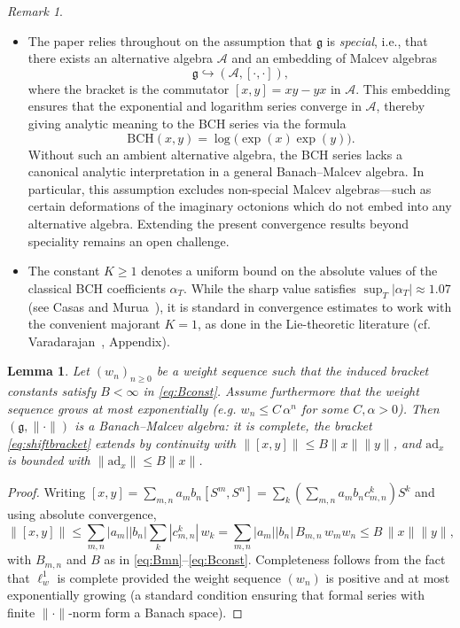 \documentclass[11pt]{amsart}
\numberwithin{equation}{section}
\newtheorem{lemma}[theorem]{Lemma}
\theoremstyle{remark}
\newtheorem{remark}[theorem]{Remark}
\begin{document}
\begin{remark}\begin{itemize}
\item The paper relies throughout on the assumption that $\mathfrak{g}$ is \emph{special}, i.e., that there exists an alternative algebra $\mathcal A$ and an embedding of Malcev algebras
\[
\mathfrak{g} \hookrightarrow (\mathcal A, [\cdot,\cdot]),
\]
where the bracket is the commutator $[x,y] = xy - yx$ in $\mathcal A$. This embedding ensures that the exponential and logarithm series converge in $\mathcal A$, thereby giving analytic meaning to the BCH series via the formula
\[
\mathrm{BCH}(x,y) = \log\bigl(\exp(x)\exp(y)\bigr).
\]
Without such an ambient alternative algebra, the BCH series lacks a canonical analytic interpretation in a general Banach--Malcev algebra. In particular, this assumption excludes non-special Malcev algebras—such as certain deformations of the imaginary octonions which do not embed into any alternative algebra. Extending the present convergence results beyond speciality remains an open challenge.\\

\item The constant \( K \geq 1 \) denotes a uniform bound on the absolute values of the classical BCH coefficients \( \alpha_T \). While the sharp value satisfies \( \sup_T |\alpha_T| \approx 1.07 \) (see Casas and Murua~\cite{CasasMurua2009}), it is standard in convergence estimates to work with the convenient majorant \( K = 1 \), as done in the Lie-theoretic literature (cf. Varadarajan~\cite{Varadarajan1984}, Appendix).\end{itemize}
\end{remark}

\begin{lemma}\label{lem:completeness}
Let $(w_n)_{n\ge0}$ be a weight sequence such that the induced bracket constants satisfy $B<\infty$ in \eqref{eq:Bconst}. Assume furthermore that the weight sequence grows at most exponentially (e.g. $w_n \le C\,\alpha^n$ for some $C,\alpha>0$). Then $(\mathfrak g,\|\cdot\|)$ is a Banach--Malcev algebra: it is complete, the bracket \eqref{eq:shiftbracket} extends by continuity with $\|[x,y]\| \le B\|x\|\|y\|$, and $\mathrm{ad}_x$ is bounded with $\|\mathrm{ad}_x\|\le B\|x\|$.
\end{lemma}

\begin{proof}
Writing $[x,y]=\sum_{m,n} a_m b_n [S^m,S^n]=\sum_k(\sum_{m,n} a_m b_n c_{m,n}^{k})S^k$ and using absolute convergence,
\[
\|[x,y]\|
\le \sum_{m,n} |a_m||b_n| \sum_k |c_{m,n}^k|\, w_k
= \sum_{m,n} |a_m||b_n|\, B_{m,n}\, w_m w_n
\le B\,\|x\|\|y\|,
\]
with $B_{m,n}$ and $B$ as in \eqref{eq:Bmn}–\eqref{eq:Bconst}. Completeness follows from the fact that $\ell^1_w$ is complete provided the weight sequence $(w_n)$ is positive and at most exponentially growing (a standard condition ensuring that formal series with finite $\|\cdot\|$-norm form a Banach space).
\end{proof}
\end{document}
